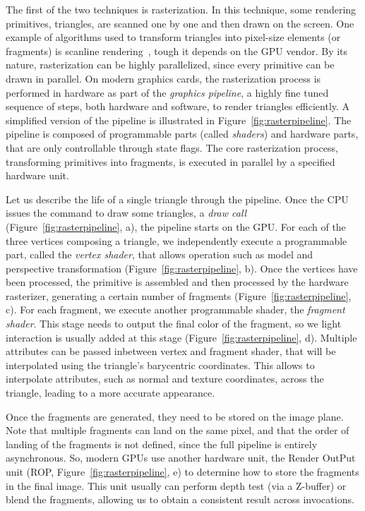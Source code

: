 The first of the two techniques is rasterization. In this technique, some rendering primitives, triangles, are scanned one by one and then drawn on the screen. One example of algorithms used to transform triangles into pixel-size elements (or fragments) is scanline rendering~\cite{Wylie1967}, tough it depends on the GPU vendor. By its nature, rasterization can be highly parallelized, since every primitive can be drawn in parallel. On modern graphics cards, the rasterization process is performed in hardware as part of the \emph{graphics pipeline}, a highly fine tuned sequence of steps, both hardware and software, to render triangles efficiently. A simplified version of the pipeline is illustrated in Figure~\ref{fig:rasterpipeline}. The pipeline is composed of programmable parts (called \emph{shaders}) and hardware parts, that are only controllable through state flags. The core rasterization process, transforming primitives into fragments, is executed in parallel by a specified hardware unit. 

Let us describe the life of a single triangle through the pipeline. Once the CPU issues the command to draw some triangles, a \emph{draw call} (Figure~\ref{fig:rasterpipeline}, a), the pipeline starts on the GPU. For each of the three vertices composing a triangle, we independently execute a programmable part, called the \emph{vertex shader}, that allows operation such as model and perspective transformation (Figure~\ref{fig:rasterpipeline}, b). Once the vertices have been processed, the primitive is assembled and then processed by the hardware rasterizer, generating a certain number of fragments  (Figure~\ref{fig:rasterpipeline}, c). For each fragment, we execute another programmable shader, the \emph{fragment shader}. This stage needs to output the final color of the fragment, so we light interaction is usually added at this stage (Figure~\ref{fig:rasterpipeline}, d). Multiple attributes can be passed inbetween vertex and fragment shader, that will be interpolated using the triangle's barycentric coordinates. This allows to interpolate attributes, such as normal and texture coordinates, across the triangle, leading to a more accurate appearance. 

Once the fragments are generated, they need to be stored on the image plane. Note that multiple fragments can land on the same pixel, and that the order of landing of the fragments is not defined, since the full pipeline is entirely asynchronous. So, modern GPUs use another hardware unit, the Render OutPut unit (ROP, Figure~\ref{fig:rasterpipeline}, e) to determine how to store the fragments in the final image. This unit usually can perform depth test (via a Z-buffer) or blend the fragments, allowing us to obtain a consistent result across invocations.

